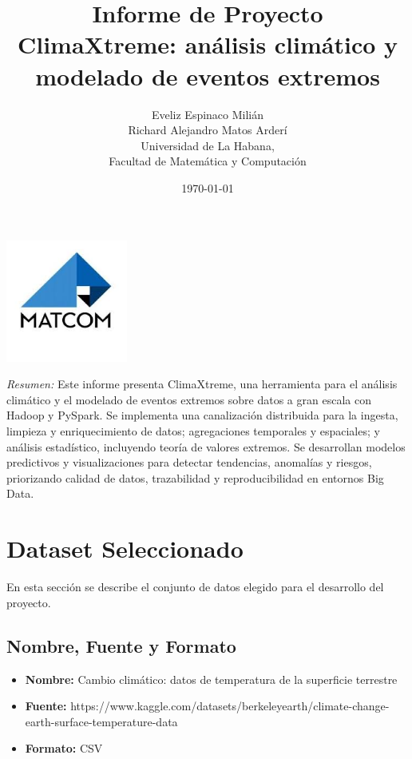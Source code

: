 \documentclass[12pt,a4paper]{scrartcl}
\title{\Huge\bfseries Informe de Proyecto\\[1ex] \Large ClimaXtreme: análisis climático y modelado de eventos extremos}
\author{Eveliz Espinaco Milián \\ Richard Alejandro Matos Arderí \\[1ex] \small Universidad de La Habana, \\Facultad de Matemática y Computación}
\date{\today}
\begin{document}
\maketitle
\thispagestyle{empty}
\begin{center}
    \includegraphics[width=0.3\textwidth]{matcom.jpeg} %
\end{center}
\vfill
\begin{center}
    \textit{Resumen:} Este informe presenta ClimaXtreme, una herramienta para el análisis climático y el modelado de eventos extremos sobre datos a gran escala con Hadoop y PySpark. Se implementa una canalización distribuida para la ingesta, limpieza y enriquecimiento de datos; agregaciones temporales y espaciales; y análisis estadístico, incluyendo teoría de valores extremos. Se desarrollan modelos predictivos y visualizaciones para detectar tendencias, anomalías y riesgos, priorizando calidad de datos, trazabilidad y reproducibilidad en entornos Big Data.
\end{center}
\newpage

\tableofcontents

\newpage
\section{Dataset Seleccionado}
En esta sección se describe el conjunto de datos elegido para el desarrollo del proyecto.


\subsection{Nombre, Fuente y Formato}
\begin{itemize}
    \item \textbf{Nombre:} Cambio climático: datos de temperatura de la superficie terrestre
    \item \textbf{Fuente:} https://www.kaggle.com/datasets/berkeleyearth/climate-change-earth-surface-temperature-data
    \item \textbf{Formato:} CSV
\end{itemize}
\end{document}
